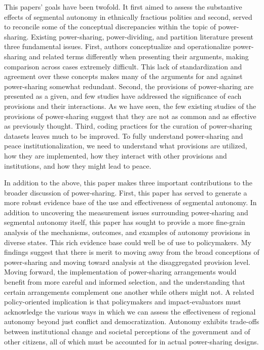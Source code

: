 \documentclass[12pt]{article}
\begin{document}
This papers' goals have been twofold. It first aimed to assess the substantive effects of segmental autonomy in ethnically fractious polities and second, served to reconcile some of the conceptual discrepancies within the topic of power-sharing. Existing power-sharing, power-dividing, and partition literature present three fundamental issues. First, authors conceptualize and operationalize power-sharing and related terms differently when presenting their arguments, making comparison across cases extremely difficult. This lack of standardization and agreement over these concepts makes many of the arguments for and against power-sharing somewhat redundant. Second, the provisions of power-sharing are presented as a given, and few studies have addressed the significance of each provisions and their interactions. As we have seen, the few existing studies of the provisions of power-sharing suggest that they are not as common and as effective as previously thought. Third, coding practices for the curation of power-sharing datasets leaves much to be improved. To fully understand power-sharing and peace institutionalization, we need to understand what provisions are utilized, how they are implemented, how they interact with other provisions and institutions, and how they might lead to peace.

In addition to the above, this paper makes three important contributions to the broader discussion of power-sharing. First, this paper has served to generate a more robust evidence base of the use and effectiveness of segmental autonomy. In addition to uncovering the measurement issues surrounding power-sharing and segmental autonomy itself, this paper has sought to provide a more fine-grain analysis of the mechanisms, outcomes, and examples of autonomy provisions in diverse states. This rich evidence base could well be of use to policymakers. My findings suggest that there is merit to moving away from the broad conceptions of power-sharing and moving toward analysis at the disaggregated provision level. Moving forward, the implementation of power-sharing arrangements would benefit from more careful and informed selection, and the understanding that certain arrangements complement one another while others might not. A related policy-oriented implication is that policymakers and impact-evaluators must acknowledge the various ways in which we can assess the effectiveness of regional autonomy beyond just conflict and democratization. Autonomy exhibits trade-offs between institutional change and societal perceptions of the government and of other citizens, all of which must be accounted for in actual power-sharing designs.
\end{document}
